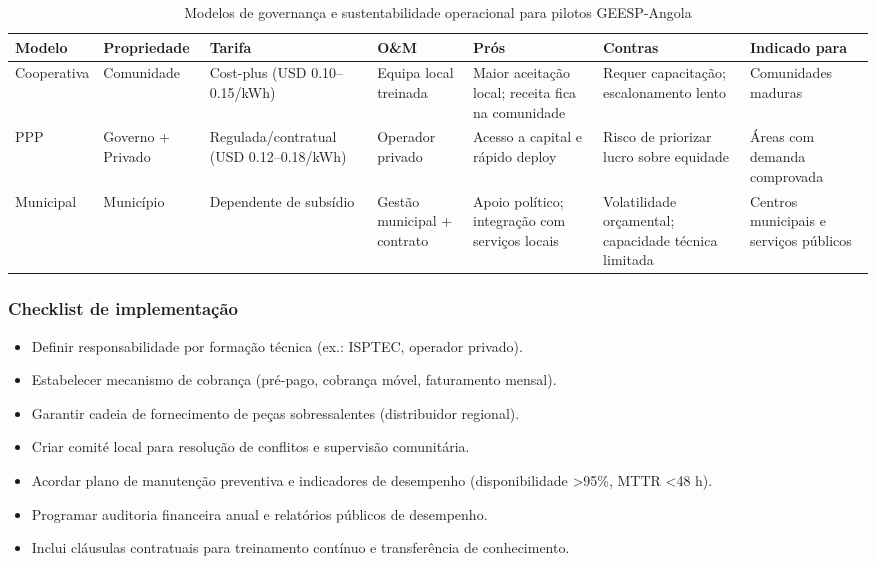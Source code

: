 \documentclass[12pt, a4paper]{article}
\begin{document}
\begin{itemize}
\begin{table}[ht]
\centering
\caption{Modelos de governança e sustentabilidade operacional para pilotos GEESP-Angola}
\label{tab:governance_models}
\begin{tabular}{|l|l|l|l|p{3.2cm}|p{3.2cm}|l|}
\hline
\textbf{Modelo} & \textbf{Propriedade} & \textbf{Tarifa} & \textbf{O\&M} & \textbf{Prós} & \textbf{Contras} & \textbf{Indicado para} \\
\hline
Cooperativa & Comunidade & Cost-plus (USD 0.10--0.15/kWh) & Equipa local treinada & Maior aceitação local; receita fica na comunidade & Requer capacitação; escalonamento lento & Comunidades maduras \\
\hline
PPP & Governo + Privado & Regulada/contratual (USD 0.12--0.18/kWh) & Operador privado & Acesso a capital e rápido deploy & Risco de priorizar lucro sobre equidade & Áreas com demanda comprovada \\
\hline
Municipal & Município & Dependente de subsídio & Gestão municipal + contrato & Apoio político; integração com serviços locais & Volatilidade orçamental; capacidade técnica limitada & Centros municipais e serviços públicos \\
\hline
\end{tabular}
\end{table}

\subsubsection*{Checklist de implementação}
\begin{itemize}
  \item Definir responsabilidade por formação técnica (ex.: ISPTEC, operador privado).
  \item Estabelecer mecanismo de cobrança (pré-pago, cobrança móvel, faturamento mensal).
  \item Garantir cadeia de fornecimento de peças sobressalentes (distribuidor regional).
  \item Criar comité local para resolução de conflitos e supervisão comunitária.
  \item Acordar plano de manutenção preventiva e indicadores de desempenho (disponibilidade >95\%, MTTR <48 h).
  \item Programar auditoria financeira anual e relatórios públicos de desempenho.
  \item Inclui cláusulas contratuais para treinamento contínuo e transferência de conhecimento.
\end{itemize}


\end{itemize}
\end{document}
